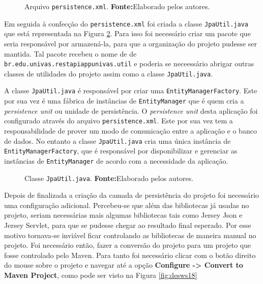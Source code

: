 	\begin{figure}[h!]
		
		\caption[Arquivo persistence.xml]{Arquivo \texttt{persistence.xml}.
		\textbf{Fonte:}Elaborado pelos autores.}
		\label{fig:desws16}
	\end{figure}
	
	\pagebreak
	
	\par Em seguida à confecção do \texttt{persistence.xml} foi criada a
classe \texttt{JpaUtil.java} que está representada na Figura \ref{fig:desws17}.
Para isso foi necessário criar um pacote que seria responsável por armazená-la,
para que a organização do projeto pudesse ser mantida. Tal pacote recebeu o nome de
de \texttt{br.edu.univas.restapiappunivas.util} e poderia se neceessário
abrigar outras classes de utilidades do projeto assim como a classe
\texttt{JpaUtil.java}.
	
	\par A classe \texttt{JpaUtil.java} é responsável por criar uma
\texttt{EntityManagerFactory}. Este por sua vez é uma  fábrica de instâncias de
\texttt{EntityManager} que é quem cria a \textit{persistence unit} ou unidade
de persistência. O \textit{persistence unit} desta aplicação foi configurado
através do arquivo \texttt{persistence.xml}. Este por sua vez tem a
responsabilidade de prover um modo de comunicação entre a aplicação e o banco
de dados. No entanto a classe \texttt{JpaUtil.java} cria uma única instância de
\texttt{EntityManagerFactory}, que é responsável por disponibilizar e gerenciar
as instâncias de \texttt{EntityManager} de acordo com a necessidade da
aplicação.
	
	\begin{figure}[h!]
		
		\caption[Classe JpaUtil.java]{Classe \texttt{JpaUtil.java}.
		\textbf{Fonte:}Elaborado pelos autores.}
		\label{fig:desws17}
	\end{figure}

	\pagebreak
	
	\par Depois de finalizada a criação da camada de persistência do projeto foi
necessário uma configuração adicional. Percebeu-se que além das bibliotecas já
usadas no projeto, seriam necessárias mais algumas bibliotecas tais como Jersey
Json e Jersey Servlet, para que se pudesse chegar ao resultado final esperado.
Por esse motivo tornava-se inviável ficar controlando as bibliotecas de maneira
manual no projeto. Foi necessário então, fazer a conversão do projeto para um
projeto que fosse controlado pelo Maven. Para tanto foi necessário clicar com o
botão direito do mouse sobre o projeto e navegar até a opção \textbf{Configure
-> Convert to Maven Project}, como pode ser visto na Figura \ref{fig:desws18}

